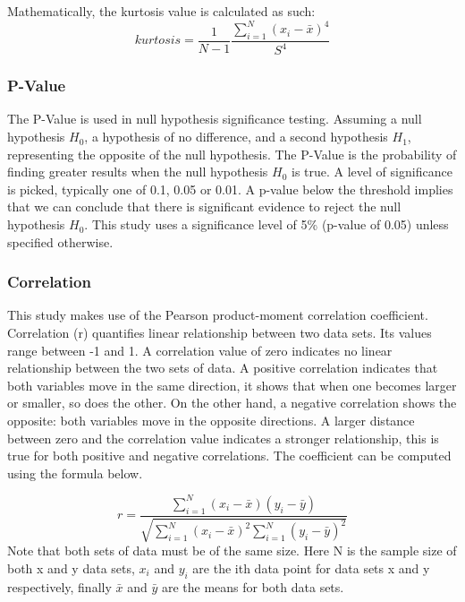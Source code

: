 Mathematically, the kurtosis value is calculated as such:
\begin{equation}
    kurtosis = \frac{1}{N - 1} \frac{\sum_{i=1}^{N}(x_{i} - \bar{x})^{4}}{S^{4}}
\end{equation}

\subsubsection{P-Value}

The P-Value is used in null hypothesis significance testing. Assuming a null hypothesis $H_{0}$, a hypothesis of no difference, and a second hypothesis $H_{1}$, representing the opposite of the null hypothesis. The P-Value is the probability of finding greater results when the null hypothesis $H_{0}$ is true. A level of significance is picked, typically one of 0.1, 0.05 or 0.01. A p-value below the threshold implies that we can conclude that there is significant evidence to reject the null hypothesis $H_{0}$. This study uses a significance level of 5\% (p-value of 0.05) unless specified otherwise.

\subsubsection{Correlation}

This study makes use of the Pearson product-moment correlation coefficient. Correlation (r) quantifies linear relationship between two data sets. Its values range between -1 and 1. A correlation value of zero indicates no linear relationship between the two sets of data. A positive correlation indicates that both variables move in the same direction, it shows that when one becomes larger or smaller, so does the other. On the other hand, a negative correlation shows the opposite: both variables move in the opposite directions. 
A larger distance between zero and the correlation value indicates a stronger relationship, this is true for both positive and negative correlations. The coefficient can be computed using the formula below.

\begin{equation}
    r = \frac{\sum_{i=1}^{N}(x_{i} - \bar{x})(y_{i} - \bar{y})}{\sqrt{\sum_{i=1}^{N}(x_{i} - \bar{x})^{2}\sum_{i=1}^{N}(y_{i} - \bar{y})^{2}}}
\end{equation}
Note that both sets of data must be of the same size. Here N is the sample size of both x and y data sets, $x_{i}$ and $y_{i}$ are the ith data point for data sets x and y respectively, finally $\bar{x}$ and $\bar{y}$ are the means for both data sets.

